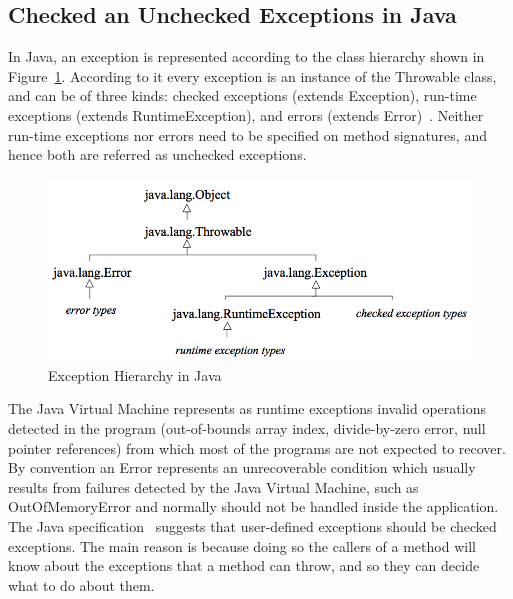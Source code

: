 \documentclass[conference]{IEEEtran}
\begin{document}



\subsection{Checked an Unchecked Exceptions in Java} \label{sec:extypes}

In Java, an exception is represented according to the class hierarchy shown in
Figure~\ref{fig:exchier}.  According to it every exception is an
instance of the Throwable class, and can be of three kinds: checked exceptions
(extends Exception), run-time exceptions (extends RuntimeException), and errors
(extends Error)~\cite{gosling2000java}. Neither run-time exceptions nor errors need to be specified on method
signatures, and hence both are referred as unchecked exceptions. 

\begin{figure} \centering \includegraphics[width=\hsize]{new2_hierarchy.png}
  \caption{Exception Hierarchy in Java} \label{fig:exchier} \end{figure}

The Java Virtual Machine represents as runtime exceptions invalid operations detected in
the program (out-of-bounds array index, divide-by-zero error, null pointer
references) from which most of the programs are not expected to recover. By
convention an Error represents an unrecoverable condition which usually results
from failures detected by the Java Virtual Machine, such as OutOfMemoryError and
normally should not be handled inside the application. The Java specification~\cite{gosling2000java} 
suggests that user-defined exceptions should be checked exceptions. The main reason is because doing so the
callers of a method will know about the exceptions that a method can throw, and
so they can decide what to do about them. 
\end{document}
